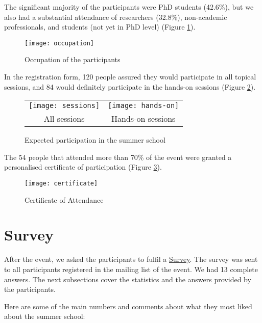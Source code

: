 The significant majority of the participants were PhD students (42.6\%), but we also had a substantial attendance of researchers (32.8\%), non-academic professionals, and students (not yet in PhD level) (Figure \ref{fig:occupation}).

\begin{figure}[H]
\centering
\texttt{[image: occupation]}
\caption{\label{fig:occupation} Occupation of the participants}
\end{figure}

In the registration form, 120 people assured they would participate in all topical sessions, and 84 would definitely participate in the hands-on sessions (Figure \ref{fig:part}).

\begin{figure}[H]
\centering
\begin{tabular}{cc}
\texttt{[image: sessions]} &
\texttt{[image: hands-on]} \\
\hspace{-3cm} All sessions &
Hands-on sessions
\end{tabular}
\caption{\label{fig:part} Expected participation in the summer school}
\end{figure}


The 54 people that attended more than 70\% of the event were granted a personalised certificate of participation (Figure \ref{fig:cert}).

\begin{figure}[H]
\centering
\texttt{[image: certificate]}
\caption{\label{fig:cert} Certificate of Attendance}
\end{figure}

\section{Survey}

After the event, we asked the participants to fulfil a \href{https://docs.google.com/forms/d/1UMMUGfos13HmsvMO6WFBrDXQkNIhOxoLooBBgoSde-I}{Survey}. The survey was sent to all participants registered in the mailing list of the event. We had 13 complete answers. The next subsections cover the statistics and the answers provided by the participants.

Here are some of the main numbers and comments about what they most liked about the summer school:

